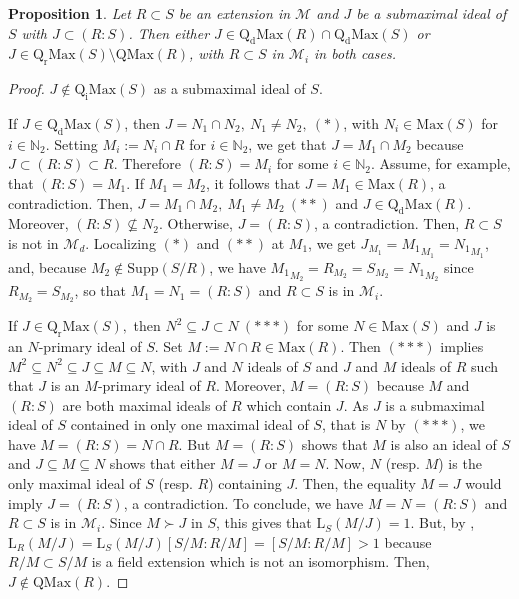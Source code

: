 \documentclass[12pt,leqno]{amsart}
\newtheorem{proposition}[theorem]{Proposition}
\theoremstyle{definition}
\begin{document}
\begin{proposition}\label{4.81} Let $R\subset S$ be an extension in $\mathcal M$ and $J$ be a submaximal ideal of $S$ with $J\subset (R:S)$. 
Then either $J\in\mathrm{Q_dMax}(R)\cap\mathrm{Q_dMax}(S)$ or $J\in\mathrm{Q_rMax}(S)\setminus\mathrm{QMax}(R)$, with $R\subset S$ in $\mathcal M_i$ in both  cases. 
\end{proposition}
\begin{proof} $J\not\in\mathrm{Q_iMax}(S)$ as a submaximal ideal of $S$. 

If $J\in\mathrm{Q_dMax}(S)$, then $J=N_1\cap N_ 2,\ N_1\neq N_2,\ (*)$, with $N_i\in\mathrm{Max}(S)$ for $i\in\mathbb N_2$. Setting $M_i:=N_i\cap R$ for $i\in\mathbb N_2$, we get that $J=M_1\cap M_2$ because $J\subset(R:S)\subset R$. Therefore $(R:S)=M_i$ for some $i\in\mathbb N_2 $. Assume, for example, that $(R:S)=M_1$. If $M_1=M_2$, it follows that $ J=M_1\in\mathrm{Max}(R)$, a contradiction. Then, $J= M_1\cap M_2,\ M_1\neq M_2\ (**)$ and $J\in\mathrm{Q_dMax}(R)$. Moreover, $(R:S)\not\subseteq N_2 $. Otherwise, $J=(R:S)$, a contradiction. Then, $R\subset S$ is not in $\mathcal M_d$. Localizing $(*)$ and $(**)$ at $M_1$, we get $J_{M_1}={M_1}_{M_1}={N_1}_{M_1}$, and, because $M_2\not\in\mathrm {Supp}(S/R)$, we have ${M_1}_{M_2}=R_{M_2}=S_{M_2}={N_1}_{M_2}$ since $R_{M_2}=S_{M_2}$, so that $M_1=N_1=(R:S)$ and $R\subset S$ is in $\mathcal M_i$. 

If $J\in\mathrm{Q_rMax}(S),$ then $N^2\subseteq J\subset N\ (***)$ for some $N\in\mathrm{Max}(S)$ and $J$ is an $N$-primary ideal of $S$. Set $M:=N\cap R\in\mathrm{Max}(R)$. Then $(***)$ implies $M^2\subseteq N^2\subseteq J\subseteq M\subseteq N$, with $J$ and $N$ ideals of $S$ and $J$ and $M$ ideals of $R$ such that $J$ is an $M$-primary ideal of $ R$. Moreover, $M=(R:S)$ because $M$ and $(R:S)$ are both maximal ideals of $R$ which contain $J$. As $J$ is a submaximal ideal of $S$ contained in only one maximal ideal of $S$, that is $N$ by $(***)$, we have $M=(R:S)=N\cap R$. But $M= (R:S)$ shows that $M$ is also an ideal of $ S$ and $J\subseteq M\subseteq N$ shows that either $M=J$ or $M=N$. Now, $N$ (resp. $M$) is the only maximal ideal of $S$ (resp. $R$) containing $J$. Then, the equality $M=J$ would imply $J=(R:S)$, a contradiction. To conclude, we have $M=N=(R:S)$ and $R\subset S$ is in $\mathcal M_i$. Since $M\succ J$ in $S$, this gives that $\mathrm{L}_S (M/J)=1$. But, by \cite[Theorem 13, p.168]{N}, $\mathrm{L}_R(M/J)=\mathrm{L}_S(M/J)[S/M:R/M]=[S/M:R/M]> 1$ because $R/M\subset S/M$ is a field extension which is not an isomorphism. Then, $J\not\in\mathrm {QMax}(R)$.
\end{proof}
\end{document}
